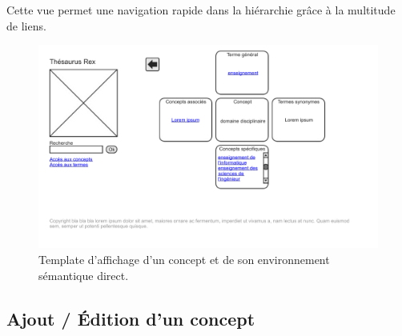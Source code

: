 Cette vue permet une navigation rapide dans la hiérarchie grâce à la multitude de liens.
\begin{figure}[H]
\begin{center}
\includegraphics[width=\textwidth]{files/template_concept}
\end{center}
\caption{Template d'affichage d'un concept et de son environnement sémantique direct.}
\end{figure}

\subsection{Ajout / Édition d'un concept}

